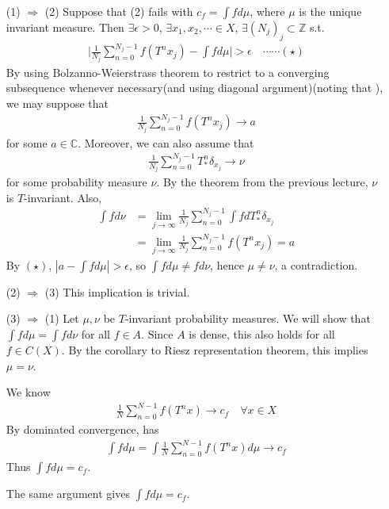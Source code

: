 \documentclass[10pt,a4paper]{report}
\newenvironment{proof}
{\begin{changemargin}{1cm}{0.5cm} 
	}%
	{\end{changemargin}
}
\begin{document}
\begin{proof}
\pf \begin{itemize}
\item[(1) $\Rightarrow$ (2)] Suppose that (2) fails with $c_f = \int fd\mu$, where $\mu$ is the unique invariant measure. Then $\exists \epsilon >0$, $\exists x_1, x_2, \cdots \in X$, $\exists (N_j)_{j} \subset \mathbb{Z}$ s.t. 
\begin{align*}
\Big| \frac{1}{N_j}\sum_{n=0}^{N_j -1} f(T^n x_j) - \int f d\mu \Big| > \epsilon \quad \cdots \cdots (\star)
\end{align*}
By using Bolzanno-Weierstrass theorem to restrict to a converging subsequence whenever necessary(and using diagonal argument)(noting that ), we may suppose that
\begin{align*}
\frac{1}{N_j} \sum_{n=0}^{N_j-1} f(T^n x_j) \rightarrow a
\end{align*}
for some $a\in \mathbb{C}$. Moreover, we can also assume that
\begin{align*}
\frac{1}{N_j} \sum_{n=0}^{N_j-1} T^n_* \delta_{x_j} \rightarrow \nu
\end{align*}
for some probability measure $\nu$. By the theorem from the previous lecture, $\nu$ is $T$-invariant. Also,
\begin{align*}
\int fd\nu &= \lim_{j\rightarrow \infty} \frac{1}{N_j} \sum_{n=0}^{N_j -1} \int f dT^n_* \delta_{x_j} \\
& = \lim_{j\rightarrow \infty} \frac{1}{N_j} \sum_{n=0}^{N_j-1} f(T^n x_j) =a
\end{align*}
By $(\star)$, $|a-\int fd\mu| >\epsilon$, so $\int fd\mu \neq fd\nu$, hence $\mu \neq \nu$, a contradiction.
\item[(2) $\Rightarrow$ (3)] This implication is trivial.
\item[(3) $\Rightarrow$ (1)] Let $\mu, \nu$ be $T$-invariant probability measures. We will show that $\int fd\mu = \int fd \nu$ for all $f\in A$. Since $A$ is dense, this also holds for all $f\in C(X)$. By the corollary to Riesz representation theorem, this implies $\mu = \nu$.

\quad We know
\begin{align*}
\frac{1}{N} \sum_{n=0}^{N-1} f(T^n x) \rightarrow c_f \quad \forall x\in X
\end{align*}
By dominated convergence, has
\begin{align*}
\int f d\mu = \int \frac{1}{N} \sum_{n=0}^{N-1} f(T^n x) d\mu \rightarrow c_f
\end{align*}
Thus $\int fd\mu = c_f$.

The same argument gives $\int fd\mu = c_f$.
\end{itemize}
\eop
\end{proof}
\s
\end{document}
